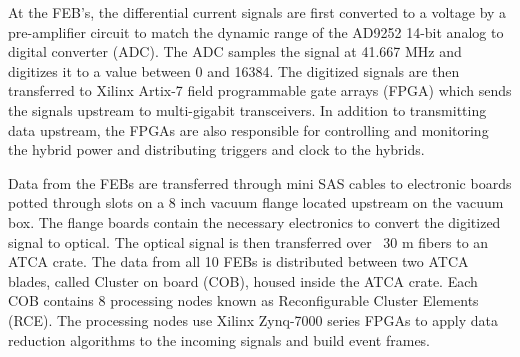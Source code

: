 At the FEB's, the differential current signals are first converted to a voltage
by a pre-amplifier circuit to match the dynamic range 
of the AD9252 14-bit analog to digital converter (ADC). The ADC samples the 
signal at 41.667 MHz and digitizes it to a value between 0 and 16384.  The 
digitized signals are then transferred to Xilinx Artix-7 field programmable
gate arrays (FPGA) which sends the signals upstream to multi-gigabit transceivers.
In addition to transmitting data upstream, the FPGAs are also responsible for 
controlling and monitoring the hybrid power and distributing triggers and 
clock to the hybrids.

Data from the FEBs are transferred through 
mini SAS cables to electronic boards potted through slots on a 8 inch vacuum 
flange located upstream on the vacuum box. The flange boards contain the necessary
electronics to convert the digitized signal to optical.
The optical signal is then transferred over ~30 m fibers to an ATCA crate. The
data from all 10 FEBs is distributed between two
ATCA blades, called Cluster on board (COB), housed inside the ATCA crate.
Each COB contains
8 processing nodes known as Reconfigurable Cluster Elements (RCE). The 
processing nodes use Xilinx Zynq-7000 series FPGAs to apply data reduction
algorithms to the incoming signals and build event frames.  



